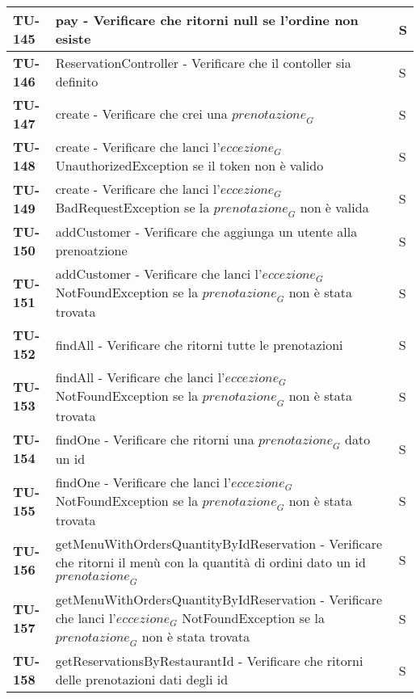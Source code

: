 \begin{longtable}{|>{\centering\arraybackslash}p{2cm}|p{15cm}|p{1cm}|}
  \hline
  \rowcolor{gray!10}
  \textbf{TU-145} & pay - Verificare che ritorni null se l'ordine non esiste   & S \\ 
  \hline
  \rowcolor{gray!10}
  \textbf{TU-146} & ReservationController - Verificare che il contoller sia definito  & S \\ 
  \hline
  \rowcolor{gray!10}
  \textbf{TU-147} & create - Verificare che crei una $\textit{prenotazione}_G$  & S \\ 
  \hline
  \rowcolor{gray!10}
  \textbf{TU-148} & create - Verificare che lanci l'$\textit{eccezione}_G$ UnauthorizedException se il token non è valido & S \\ 
  \hline
  \rowcolor{gray!10}
  \textbf{TU-149} & create - Verificare che lanci l'$\textit{eccezione}_G$ BadRequestException se la $\textit{prenotazione}_G$ non è valida & S \\ 
  \hline
  \rowcolor{gray!10}
  \textbf{TU-150} & addCustomer - Verificare che aggiunga un utente alla prenoatzione & S \\ 
  \hline
  \rowcolor{gray!10}
  \textbf{TU-151} & addCustomer - Verificare che lanci l'$\textit{eccezione}_G$ NotFoundException se la $\textit{prenotazione}_G$ non è stata trovata & S \\ 
  \hline
  \rowcolor{gray!10}
  \textbf{TU-152} & findAll - Verificare che ritorni tutte le prenotazioni & S \\ 
  \hline
  \rowcolor{gray!10}
  \textbf{TU-153} & findAll - Verificare che lanci l'$\textit{eccezione}_G$ NotFoundException se la $\textit{prenotazione}_G$ non è stata trovata & S \\ 
  \hline
  \rowcolor{gray!10}
  \textbf{TU-154} & findOne - Verificare che ritorni una $\textit{prenotazione}_G$ dato un id & S \\ 
  \hline
  \rowcolor{gray!10}
  \textbf{TU-155} & findOne - Verificare che lanci l'$\textit{eccezione}_G$ NotFoundException se la $\textit{prenotazione}_G$ non è stata trovata & S \\ 
  \hline
  \rowcolor{gray!10}
  \textbf{TU-156} & getMenuWithOrdersQuantityByIdReservation - Verificare che ritorni il menù con la quantità di ordini dato un id $\textit{prenotazione}_G$ & S \\ 
  \hline
  \rowcolor{gray!10}
  \textbf{TU-157} & getMenuWithOrdersQuantityByIdReservation - Verificare che lanci l'$\textit{eccezione}_G$ NotFoundException se la $\textit{prenotazione}_G$ non è stata trovata & S \\ 
  \hline
  \rowcolor{gray!10}
  \textbf{TU-158} & getReservationsByRestaurantId - Verificare che ritorni delle prenotazioni dati degli id & S \\ 

\end{longtable}
